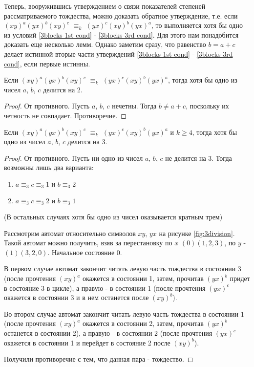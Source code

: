 	Теперь, вооружившись утверждением о связи показателей степеней рассматриваемого тождества, можно доказать обратное утверждение, т.е. если $(xy)^a(yx)^b(xy)^c$ $\equiv_k$ $(yx)^c(xy)^b(yx)^a$, то выполняется хотя бы одно из условий \ref{3blocks 1st cond} - \ref{3blocks 3rd cond}. Для этого нам понадобится доказать еще несколько лемм.
	Однако заметим сразу, что равенство $b = a + c$ делает истинной вторые части утверждений \ref{3blocks 1st cond} - \ref{3blocks 3rd cond}, если первые истинны.
	
	\begin{lemma}\label{abc div 2}
		Если $(xy)^a(yx)^b(xy)^c$ $\equiv_k$ $(yx)^c(xy)^b(yx)^a$, тогда хотя бы одно из чисел $a$, $b$, $c$ делится на 2.
	\end{lemma}
	\begin{proof}
		От противного. Пусть $a$, $b$, $c$ нечетны. Тогда $b \ne a+c$, поскольку их четность не совпадает. Противоречие.
	\end{proof}
	
	\begin{lemma}\label{abc div 3}
		Если $(xy)^a(yx)^b(xy)^c$ $\equiv_k$ $(yx)^c(xy)^b(yx)^a$ и $k \ge 4$, тогда хотя бы одно из чисел $a$, $b$, $c$ делится на 3.
	\end{lemma}
	\begin{proof}
		От противного. Пусть ни одно из чисел $a$, $b$, $c$ не делится на 3. Тогда возможны лишь два варианта:
		\begin{enumerate}
			\item $a \equiv_3 c \equiv_3 1$ и $b \equiv_3 2$
			\item $a \equiv_3 c \equiv_3 2$ и $b \equiv_3 1$
		\end{enumerate}
		
		(В остальных случаях хотя бы одно из чисел оказывается кратным трем)
		
		Рассмотрим автомат относительно символов $xy$, $yx$ на рисунке \ref{fig:3division}. Такой автомат можно получить, взяв за перестановку по $x$ $(0)(1,2,3)$, по $y$ - $(1)(3, 2, 0)$. Начальное состояние 0.
		
		В первом случае автомат закончит читать левую часть тождества в состоянии 3 (после прочтения $(xy)^a$ окажется в состоянии 1, затем, прочитав $(yx)^b$ придет в состояние 3 в цикле), а правую - в состоянии 1 (после прочтения $(yx)^c$ окажется в состоянии 3 и в нем останется после $(xy)^b$).
		
		
		Во втором случае автомат закончит читать левую часть тождества в состоянии 1 (после прочтения $(xy)^a$ окажется в состоянии 2, затем, прочитав $(yx)^b$ останется в состоянии 2), а правую - в состоянии 2 (после прочтения $(yx)^c$ окажется в состоянии 1 и перейдет в состояние 2 после $(xy)^b$).
		
		Получили противоречие с тем, что данная пара - тождество.
	\end{proof}
	
